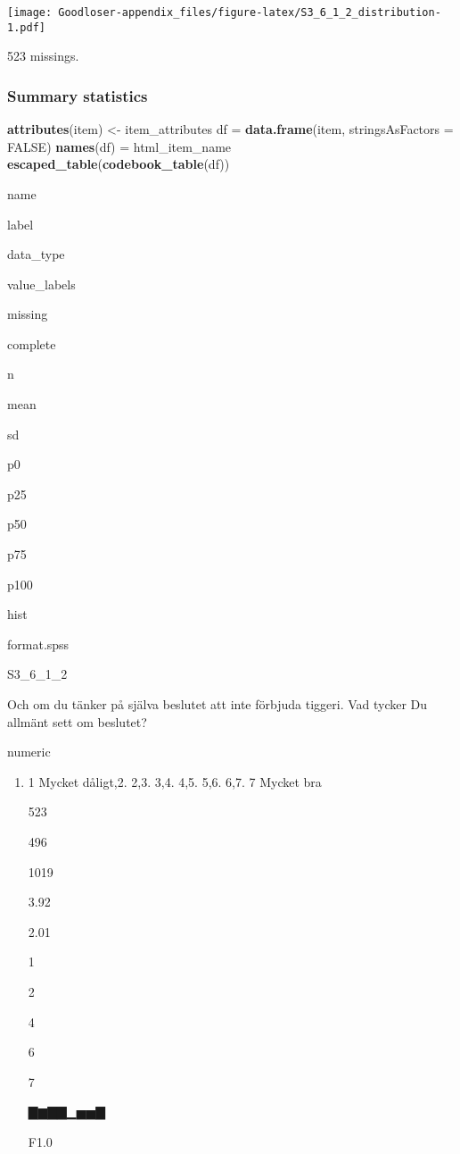 \documentclass[]{book}
\newenvironment{Shaded}{\begin{snugshade}}{\end{snugshade}}
\newcommand{\KeywordTok}[1]{\textcolor[rgb]{0.13,0.29,0.53}{\textbf{#1}}}
\newcommand{\DataTypeTok}[1]{\textcolor[rgb]{0.13,0.29,0.53}{#1}}
\newcommand{\StringTok}[1]{\textcolor[rgb]{0.31,0.60,0.02}{#1}}
\newcommand{\OtherTok}[1]{\textcolor[rgb]{0.56,0.35,0.01}{#1}}
\newcommand{\OperatorTok}[1]{\textcolor[rgb]{0.81,0.36,0.00}{\textbf{#1}}}
\newcommand{\NormalTok}[1]{#1}
\providecommand{\tightlist}{%
  \setlength{\itemsep}{0pt}\setlength{\parskip}{0pt}}
\begin{document}
\texttt{[image: Goodloser-appendix\_files/figure-latex/S3\_6\_1\_2\_distribution-1.pdf]}

\begin{Shaded}
\end{Shaded}

523 missings.

\subsubsection{Summary statistics}\label{S3_6_1_2_summary}

\begin{Shaded}
\begin{Highlighting}[]
\KeywordTok{attributes}\NormalTok{(item) <-}\StringTok{ }\NormalTok{item_attributes}
\NormalTok{df =}\StringTok{ }\KeywordTok{data.frame}\NormalTok{(item, }\DataTypeTok{stringsAsFactors =} \OtherTok{FALSE}\NormalTok{)}
\KeywordTok{names}\NormalTok{(df) =}\StringTok{ }\NormalTok{html_item_name}
\KeywordTok{escaped_table}\NormalTok{(}\KeywordTok{codebook_table}\NormalTok{(df))}
\end{Highlighting}
\end{Shaded}

name

label

data\_type

value\_labels

missing

complete

n

mean

sd

p0

p25

p50

p75

p100

hist

format.spss

S3\_6\_1\_2

Och om du tänker på själva beslutet att inte förbjuda tiggeri. Vad
tycker Du allmänt sett om beslutet?

numeric

\begin{enumerate}
\def\labelenumi{\arabic{enumi}.}
\tightlist
\item
  1 Mycket dåligt,2. 2,3. 3,4. 4,5. 5,6. 6,7. 7 Mycket bra

  523

  496

  1019

  3.92

  2.01

  1

  2

  4

  6

  7

  ▇▆▇▇▁▅▅▇

  F1.0
\end{enumerate}
\end{document}
